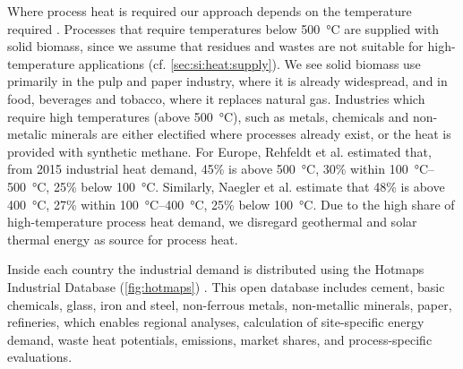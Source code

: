 Where process heat is required our approach depends on the temperature required
.
Processes that require temperatures below \SI{500}{\celsius} are supplied with
solid biomass, since we assume that residues and wastes are not suitable for
high-temperature applications (cf. \cref{sec:si:heat:supply}). We see solid
biomass use primarily in the pulp and paper industry, where it is already
widespread, and in food, beverages and tobacco, where it replaces natural gas.
Industries which require high temperatures (above \SI{500}{\celsius}), such as
metals, chemicals and non-metalic minerals are either electified where processes
already exist, or the heat is provided with synthetic methane. For Europe,
Rehfeldt et al.  estimated that, from 2015
industrial heat demand, 45\% is above \SI{500}{\celsius}, 30\% within
\SIrange{100}{500}{\celsius}, 25\% below \SI{100}{\celsius}. Similarly, Naegler
et al.  estimate that 48\% is above
\SI{400}{\celsius}, 27\% within \SIrange{100}{400}{\celsius}, 25\% below
\SI{100}{\celsius}. Due to the high share of high-temperature process heat
demand, we disregard geothermal and solar thermal energy as source for process
heat.

Inside each country the industrial demand is distributed using the Hotmaps
Industrial Database (\cref{fig:hotmaps}) \citeS{}. This open database includes
cement, basic chemicals, glass, iron and steel, non-ferrous metals, non-metallic
minerals, paper, refineries, which enables regional analyses, calculation of
site-specific energy demand, waste heat potentials, emissions, market shares,
and process-specific evaluations.




